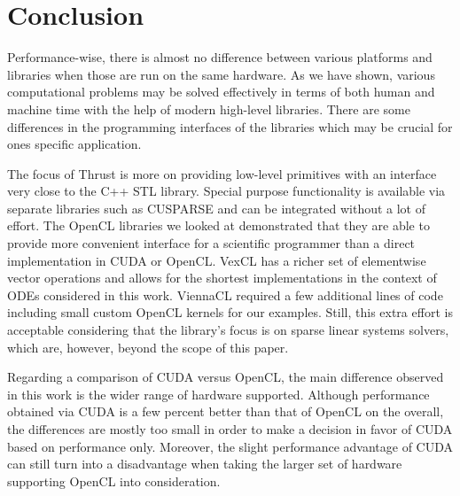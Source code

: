\documentclass[final]{siamltex}
\begin{document}
%









%
%
\section{Conclusion}

Performance-wise, there is almost no difference between various platforms and
libraries when those are run on the same hardware. As we have shown, various
computational problems may be solved effectively in terms of both human and
machine time with the help of modern high-level libraries.  There are some
differences in the programming interfaces of the libraries which may be crucial
for ones specific application.

The focus of Thrust is more on providing low-level primitives with an interface
very close to the C++ STL library.
Special purpose functionality is available via separate libraries such as CUSPARSE
and can be integrated without a lot of effort.
The OpenCL libraries we looked at demonstrated that they are able to
provide more convenient interface for a scientific programmer than a direct
implementation in CUDA or OpenCL.
VexCL has a richer set of elementwise vector operations and allows for the
shortest implementations in the context of ODEs considered in this work.
ViennaCL required a few additional lines of code including small custom OpenCL kernels for our examples.
Still, this extra effort is acceptable considering that the library's focus is on sparse linear systems solvers,
which are, however, beyond the scope of this paper.

Regarding a comparison of CUDA versus OpenCL, the main difference observed in this work is the wider range of hardware supported.
Although performance obtained via CUDA is a few percent better than that of OpenCL on the overall,
the differences are mostly too small in order to make a decision in favor of CUDA based on performance only.
Moreover, the slight performance advantage of CUDA can still turn into a disadvantage when taking the larger set of hardware supporting OpenCL into consideration.
\end{document}
